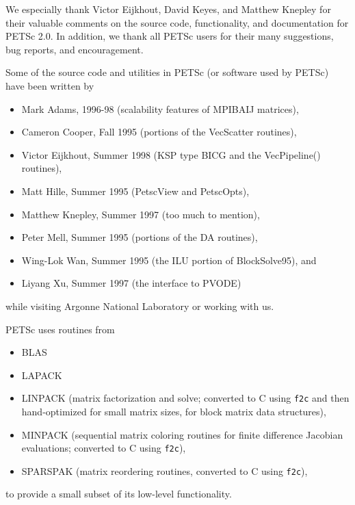%
%

\medskip \medskip \noindent
We especially thank Victor Eijkhout, David Keyes, and Matthew Knepley for their valuable 
comments on the 
source code, functionality, and documentation  for PETSc 2.0.  
In addition, we thank all PETSc users for
their many suggestions, bug reports, and encouragement.


\vspace{.3in}
\noindent
Some of the source code and utilities in PETSc (or software used by PETSc)
have been written by 
\begin{itemize}
  \item Mark Adams, 1996-98 (scalability features of MPIBAIJ matrices),
  \item Cameron Cooper, Fall 1995 (portions of the VecScatter routines), 
  \item Victor Eijkhout, Summer 1998 (KSP type BICG and the VecPipeline() routines), 
  \item Matt Hille, Summer 1995 (PetscView and PetscOpts), 
  \item Matthew Knepley, Summer 1997 (too much to mention),
  \item Peter Mell, Summer 1995 (portions of the DA routines),
  \item Wing-Lok Wan, Summer 1995 (the ILU portion of BlockSolve95), and
  \item Liyang Xu, Summer 1997 (the interface to PVODE)
\end{itemize}
while visiting Argonne National Laboratory or working with us.

\vspace{.3in}
\noindent
PETSc uses routines from 
\begin{itemize}
  \item BLAS
  \item LAPACK
  \item LINPACK      (matrix factorization and solve; converted to C using {\tt f2c} and then 
                      hand-optimized for small matrix sizes, for block matrix data structures),
  \item MINPACK      (sequential matrix coloring routines for finite difference Jacobian
                       evaluations; converted to C using {\tt f2c}),
  \item SPARSPAK     (matrix reordering routines, converted to C using {\tt f2c}),
\end{itemize}
to provide a small subset of its low-level functionality.

